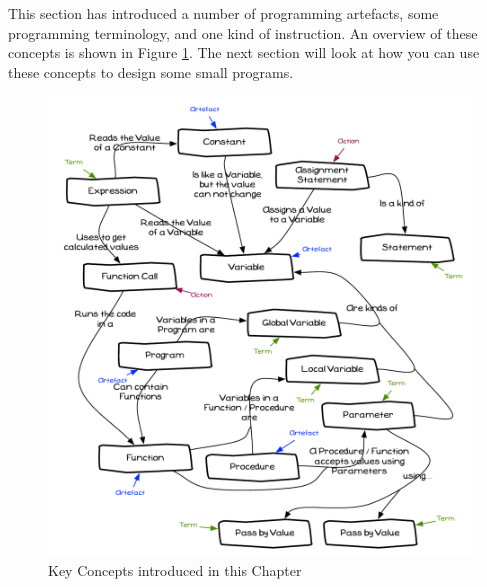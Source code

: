 This section has introduced a number of programming artefacts, some programming terminology, and one kind of instruction. An overview of these concepts is shown in Figure \ref{fig:data-summary}. The next section will look at how you can use these concepts to design some small programs.

\begin{figure}[h]
   \centering
   \includegraphics[width=\textwidth]{./topics/storing-using-data/diagrams/Summary} 
   \caption[Chapter Concepts]{Key Concepts introduced in this Chapter}
   \label{fig:data-summary}
\end{figure}




